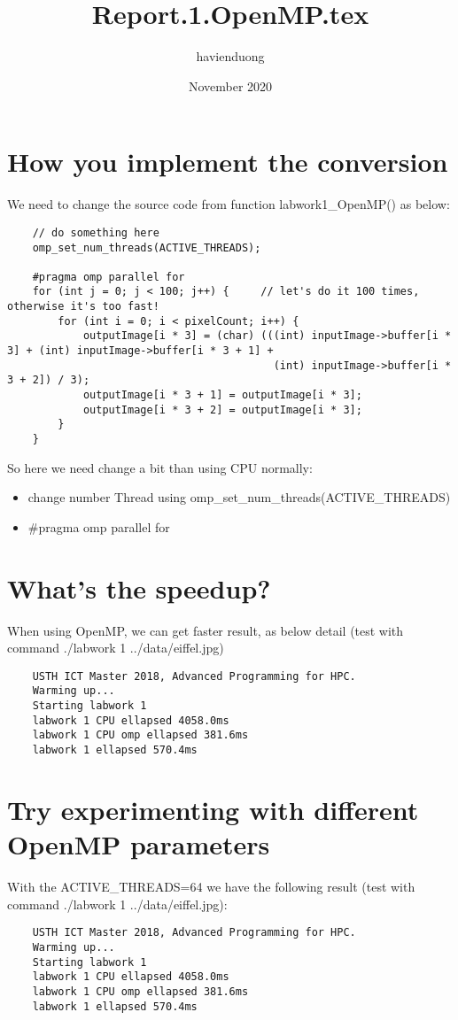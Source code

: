 \documentclass{article}
\title{Report.1.OpenMP.tex}
\author{havienduong }
\date{November 2020}
\begin{document}
\maketitle

\section{How you implement the conversion}
We need to change the source code from function labwork1\_OpenMP() as below:
\begin{verbatim}
    // do something here
    omp_set_num_threads(ACTIVE_THREADS);

    #pragma omp parallel for
    for (int j = 0; j < 100; j++) {     // let's do it 100 times, otherwise it's too fast!
        for (int i = 0; i < pixelCount; i++) {
            outputImage[i * 3] = (char) (((int) inputImage->buffer[i * 3] + (int) inputImage->buffer[i * 3 + 1] +
                                          (int) inputImage->buffer[i * 3 + 2]) / 3);
            outputImage[i * 3 + 1] = outputImage[i * 3];
            outputImage[i * 3 + 2] = outputImage[i * 3];
        }
    }
\end{verbatim}

So here we need change a bit than using CPU normally:
\begin{itemize}
    \item change number Thread using omp\_set\_num\_threads(ACTIVE\_THREADS)
    \item \#pragma omp parallel for
\end{itemize}

\section{What’s the speedup?}
When using OpenMP, we can get faster result, as below detail (test with command ./labwork 1 ../data/eiffel.jpg)
\begin{verbatim}
    USTH ICT Master 2018, Advanced Programming for HPC.
    Warming up...
    Starting labwork 1
    labwork 1 CPU ellapsed 4058.0ms
    labwork 1 CPU omp ellapsed 381.6ms
    labwork 1 ellapsed 570.4ms
\end{verbatim}

\section{Try experimenting with different OpenMP parameters}
With the ACTIVE\_THREADS=64 we have the following result (test with command ./labwork 1 ../data/eiffel.jpg):
\begin{verbatim}
    USTH ICT Master 2018, Advanced Programming for HPC.
    Warming up...
    Starting labwork 1
    labwork 1 CPU ellapsed 4058.0ms
    labwork 1 CPU omp ellapsed 381.6ms
    labwork 1 ellapsed 570.4ms
\end{verbatim}
\end{document}
